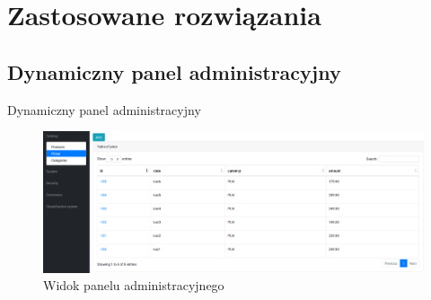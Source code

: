 \documentclass[polish,xcolor=table,9pt,aspectratio=1610,hyperref={pdfpagemode=FullScreen}]{beamer}
\begin{document}
\section{Zastosowane rozwiązania}

\subsection{Dynamiczny panel administracyjny}
\begin{frame}{Dynamiczny panel administracyjny}
\begin{figure}
	\begin{center}
		\includegraphics[scale=0.22]{admin-main.png}
	\end{center}
	\caption{{\color{black}Widok panelu administracyjnego}} 
\end{figure}
\end{frame}
\end{document}
